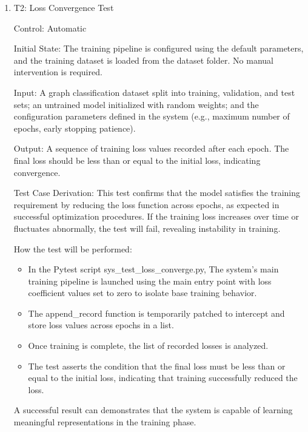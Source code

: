 \documentclass[12pt, titlepage]{article}
\begin{document}
\begin{enumerate}

\item{T2: Loss Convergence Test\\}

Control: Automatic

Initial State: The training pipeline is configured using the default parameters, and the training dataset is loaded from the dataset folder. No manual intervention is required.

Input: A graph classification dataset split into training, validation, and test sets; an untrained model initialized with random weights; and the configuration parameters defined in the system (e.g., maximum number of epochs, early stopping patience).

Output: A sequence of training loss values recorded after each epoch. The final loss should be less than or equal to the initial loss, indicating convergence.

Test Case Derivation: This test confirms that the model satisfies the training requirement by reducing the loss function across epochs, as expected in successful optimization procedures. If the training loss increases over time or fluctuates abnormally, the test will fail, revealing instability in training.

How the test will be performed:
\begin{itemize}
    \item In the Pytest script sys\_test\_loss\_converge.py, The system’s main training pipeline is launched using the main entry point with loss coefficient values set to zero to isolate base training behavior.
    \item The append\_record function is temporarily patched to intercept and store loss values across epochs in a list.
    \item Once training is complete, the list of recorded losses is analyzed.
    \item The test asserts the condition that the final loss must be less than or equal to the initial loss, indicating that training successfully reduced the loss.
\end{itemize}

A successful result can demonstrates that the system is capable of learning meaningful representations in the training phase.

\end{enumerate}
\end{document}
